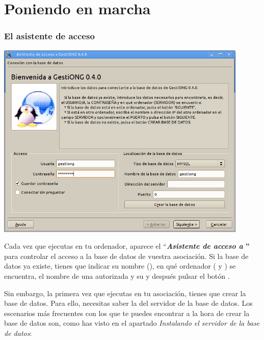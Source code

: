 \chapter{Poniendo en marcha \appname}

\label{ref:poniendoenmarcha}\subsection[El asistente de acceso]{El
asistente de acceso}

\begin{center}
\includegraphics[width=12cm]{bienvenidaagestiong.png}
\label{seq:refIllustration3}
\end{center}

Cada vez que ejecutas \appname en tu ordenador, aparece el
{\textquotedblleft}\textbf{\textit{Asistente de acceso a
\appname}}\textbf{{\textquotedblright}} para controlar el acceso a la
base de datos de vuestra asociación. Si la base de datos ya existe, tienes que indicar 
su nombre (), en qué ordenador
( y ) se
encuentra, el nombre de una  autorizada y
su  y después pulsar el botón
. 

Sin embargo, la primera vez que ejecutas \appname en tu
asociación, tienes que crear la base de datos. Para ello, necesitas
saber la  del
servidor de la base de datos. Los escenarios más frecuentes con los
que te puedes encontrar a la hora de crear la base de datos son, como
has visto en el apartado \textit{Instalando el servidor de la
base de datos}:

